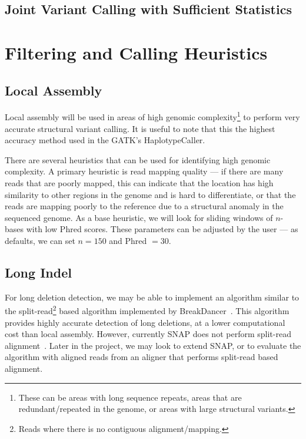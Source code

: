 \documentclass[11pt]{article}
\begin{document}
\subsection{Joint Variant Calling with Sufficient Statistics}
\label{sec:joint-variant-calling}

\section{Filtering and Calling Heuristics}
\label{sec:filtering-calling}

\subsection{Local Assembly}
\label{sec:local-assembly}

Local assembly will be used in areas of high genomic complexity\footnote{These can be areas with long sequence
repeats, areas that are redundant/repeated in the genome, or areas with large structural variants.} to perform very accurate
structural variant calling. It is useful to note that this the highest accuracy method used in the GATK's HaplotypeCaller.

There are several heuristics that can be used for identifying high genomic complexity. A primary heuristic is read mapping
quality --- if there are many reads that are poorly mapped, this can indicate that the location has high similarity to other
regions in the genome and is hard to differentiate, or that the reads are mapping poorly to the reference due to a structural
anomaly in the sequenced genome. As a base heuristic, we will look for sliding windows of $n$-bases with low Phred scores.
These parameters can be adjusted by the user --- as defaults, we can set $n = 150$ and Phred $= 30$.

\subsection{Long Indel}
\label{sec:long-indel}

For long deletion detection, we may be able to implement an algorithm similar to the split-read\footnote{Reads where
there is no contiguous alignment/mapping.} based algorithm implemented by BreakDancer~\cite{chen09}. This
algorithm provides highly accurate detection of long deletions, at a lower computational cost than local assembly.
However, currently SNAP does not perform split-read alignment~\cite{zaharia11}. Later in the project, we may
look to extend SNAP, or to evaluate the algorithm with aligned reads from an aligner that performs split-read based
alignment.
\end{document}
